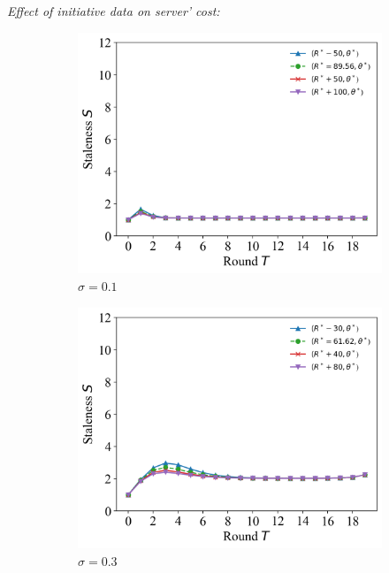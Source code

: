 \documentclass{article}
\theoremstyle{plain}
\theoremstyle{definition}
\theoremstyle{remark}
\begin{document}
\textit{Effect of initiative data on server' cost:}
\begin{figure}
	\begin{subfigure}{0.31\textwidth}
		\centering
    \includegraphics[width=\textwidth]{figures/figure_73_A.png}
    \caption{$\sigma=0.1$}
	\end{subfigure}
  \quad
	\begin{subfigure}{0.31\textwidth}
		\centering
		\includegraphics[width=\textwidth]{figures/figure_73_B.png}
    \caption{$\sigma=0.3$}
	\end{subfigure}
  \quad
  \begin{subfigure}{0.31\textwidth}

\end{subfigure}
\end{figure}
\end{document}
